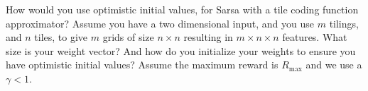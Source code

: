 How would you use optimistic initial values, for Sarsa with a tile coding function approximator? Assume you have a two dimensional input, and you use $m$ tilings, and $n$ tiles, to give $m$ grids of size $n \times n$ resulting in $m \times n \times n$ features. What size is your weight vector? And how do you initialize your weights to ensure you have optimistic initial values? Assume the maximum reward is $R_\text{max}$ and we use a $\gamma < 1$.